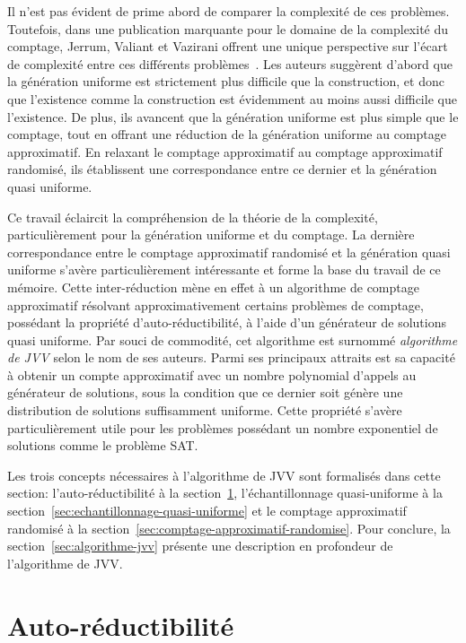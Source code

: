 Il n'est pas évident de prime abord de comparer la complexité de ces problèmes. Toutefois, dans une publication marquante pour le domaine de la complexité du comptage, Jerrum, Valiant et Vazirani offrent une unique perspective sur l'écart de complexité entre ces différents problèmes~\cite{jerrumRandomGenerationCombinatorial1986}. Les auteurs suggèrent d'abord que la génération uniforme est strictement plus difficile que la construction, et donc que l'existence comme la construction est évidemment au moins aussi difficile que l'existence. De plus, ils avancent que la génération uniforme est plus simple que le comptage, tout en offrant une réduction de la génération uniforme au comptage approximatif. En relaxant le comptage approximatif au comptage approximatif randomisé, ils établissent une correspondance entre ce dernier et la génération quasi uniforme.

Ce travail éclaircit la compréhension de la théorie de la complexité, particulièrement pour la génération uniforme et du comptage. La dernière correspondance entre le comptage approximatif randomisé et la génération quasi uniforme s'avère particulièrement intéressante et forme la base du travail de ce mémoire. Cette inter-réduction mène en effet à un algorithme de comptage approximatif résolvant approximativement certains problèmes de comptage, possédant la propriété d'auto-réductibilité, à l'aide d'un générateur de solutions quasi uniforme. Par souci de commodité, cet algorithme est surnommé \textit{algorithme de JVV} selon le nom de ses auteurs. Parmi ses principaux attraits est sa capacité à obtenir un compte approximatif avec un nombre polynomial d'appels au générateur de solutions, sous la condition que ce dernier soit génère une distribution de solutions suffisamment uniforme. Cette propriété s'avère particulièrement utile pour les problèmes possédant un nombre exponentiel de solutions comme le problème SAT.

Les trois concepts nécessaires à l'algorithme de JVV sont formalisés dans cette section: l'auto-réductibilité à la section~\ref{sec:auto-reductibilite}, l'échantillonnage quasi-uniforme à la section~\ref{sec:echantillonnage-quasi-uniforme} et le comptage approximatif randomisé à la section~\ref{sec:comptage-approximatif-randomise}. Pour conclure, la section~\ref{sec:algorithme-jvv} présente une description en profondeur de l'algorithme de JVV.


\section{Auto-réductibilité}
\label{sec:auto-reductibilite}
 
